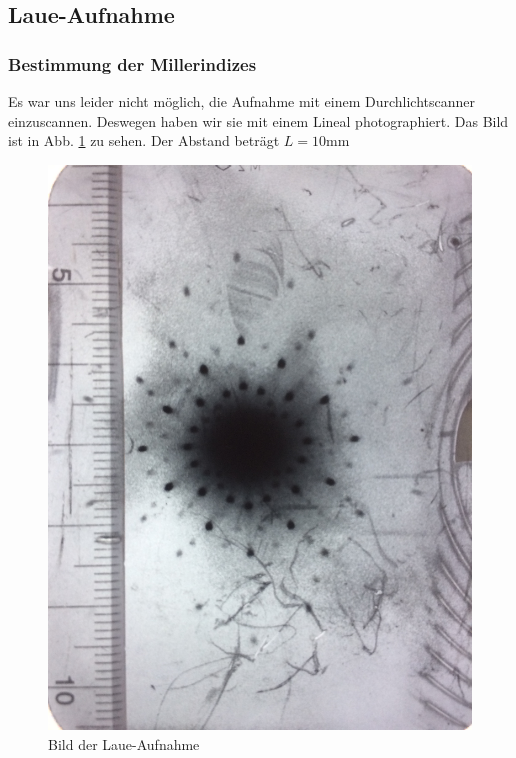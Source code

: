 \subsection{Laue-Aufnahme}
\subsubsection{Bestimmung der Millerindizes}
Es war uns leider nicht möglich, die Aufnahme mit einem Durchlichtscanner einzuscannen. Deswegen haben wir sie mit einem Lineal photographiert. Das Bild ist in Abb. \ref{fig:laue_raw} zu sehen. Der Abstand beträgt $L = 10\si{\milli\meter}$\\

\begin{figure}[h]
\centering
\includegraphics[scale=0.1]{data/laue/laue.jpeg}
\caption{Bild der Laue-Aufnahme}
\label{fig:laue_raw}
\end{figure}

